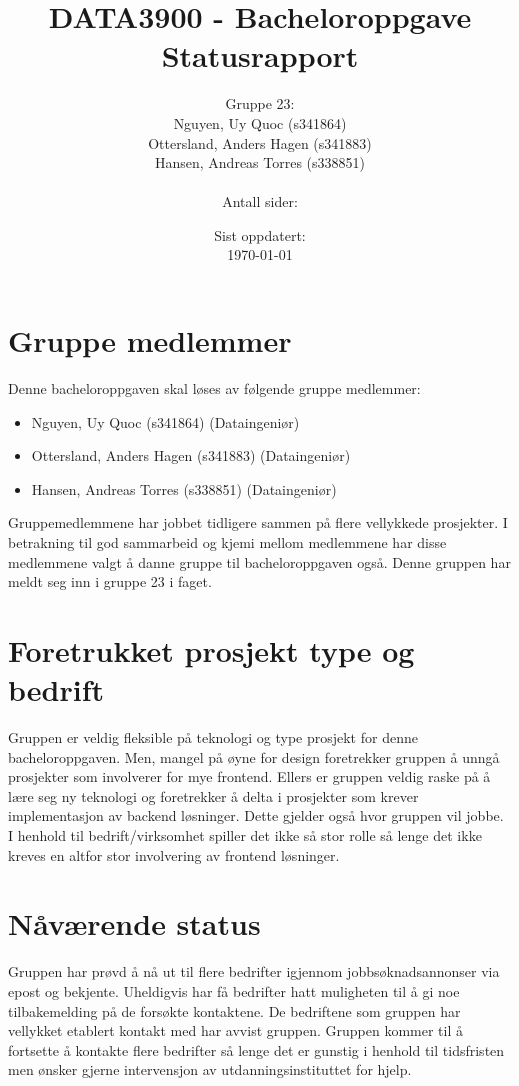 \documentclass[12pt, a4paper, norsk]{article}
\title
{
	DATA3900 - Bacheloroppgave \\
	Statusrapport
}
\author{Gruppe 23:\\
	Nguyen, Uy Quoc (s341864)\\
	Ottersland, Anders Hagen (s341883)\\
	Hansen, Andreas Torres (s338851)\\
	\\Antall sider: \pageref{LastPage}}
\date{Sist oppdatert:\\ \today}
\begin{document}
	\maketitle
	\clearpage
	\pagestyle{fancy}
	
	\section{Gruppe medlemmer}
	Denne bacheloroppgaven skal løses av følgende gruppe medlemmer:
	\begin{itemize}
		\item Nguyen, Uy Quoc (s341864) (Dataingeniør)
		\item Ottersland, Anders Hagen (s341883) (Dataingeniør)
		\item Hansen, Andreas Torres (s338851) (Dataingeniør)\\
	\end{itemize}
	Gruppemedlemmene har jobbet tidligere sammen på flere vellykkede prosjekter. I betrakning til god sammarbeid og kjemi mellom medlemmene har disse medlemmene valgt å danne gruppe til bacheloroppgaven også. Denne gruppen har meldt seg inn i gruppe 23 i faget.
	
	\section{Foretrukket prosjekt type og bedrift}
	Gruppen er veldig fleksible på teknologi og type prosjekt for denne bacheloroppgaven. Men, mangel på øyne for design foretrekker gruppen å unngå prosjekter som involverer for mye frontend. Ellers er gruppen veldig raske på å lære seg ny teknologi og foretrekker å delta i prosjekter som krever implementasjon av backend løsninger. Dette gjelder også hvor gruppen vil jobbe. I henhold til bedrift/virksomhet spiller det ikke så stor rolle så lenge det ikke kreves en altfor stor involvering av frontend løsninger.
	
	\section{Nåværende status}
	Gruppen har prøvd å nå ut til flere bedrifter igjennom jobbsøknadsannonser via epost og bekjente. Uheldigvis har få bedrifter hatt muligheten til å gi noe tilbakemelding på de forsøkte kontaktene. De bedriftene som gruppen har vellykket etablert kontakt med har avvist gruppen. Gruppen kommer til å fortsette å kontakte flere bedrifter så lenge det er gunstig i henhold til tidsfristen men ønsker gjerne intervensjon av utdanningsinstituttet for hjelp.
	
	
\end{document}
